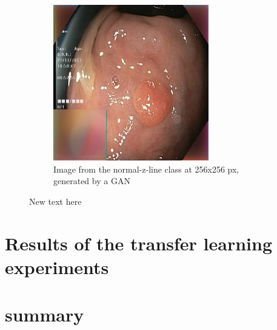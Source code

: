 \begin{figure}[t]
\begin{subfigure}[b]{0.4\textwidth}
            \includegraphics[width=\textwidth]{experiments/figures/both/greenGAN.jpg}
            \caption[]%
            {{\small Image from the normal-z-line class at 256x256 px, generated by a GAN }}    
            \label{fig:zGAN}
        \end{subfigure}
        \caption[ ]
        {\small New text here} 
        \label{fig:GC1GREEN}
    \end{figure}
    

   


\section{Results of the transfer learning experiments}



\section{summary}

















